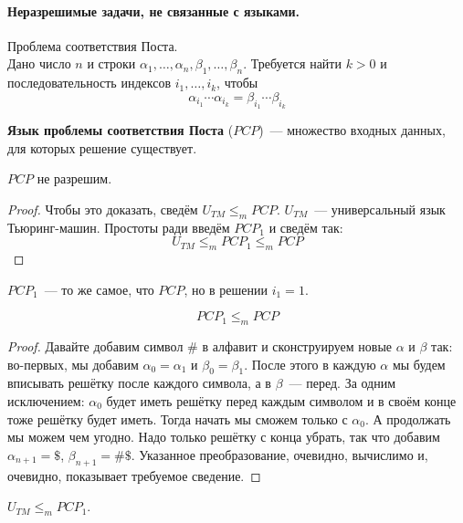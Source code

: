 \documentclass{article}
\begin{document}
    \paragraph{Неразрешимые задачи, не связанные с языками.}
    \begin{example}
        Проблема соответствия Поста.\\
        Дано число $n$ и строки $\alpha_1,\ldots,\alpha_n,\beta_1,\ldots,\beta_n$. Требуется найти $k>0$ и последовательность индексов $i_1,\ldots,i_k$, чтобы
        $$
        \alpha_{i_1}\cdots\alpha_{i_k}=\beta_{i_1}\cdots\beta_{i_k}
        $$
    \end{example}
    \begin{definition}
        \textbf{Язык проблемы соответствия Поста} ($PCP$)~--- множество входных данных, для которых решение существует.
    \end{definition}
    \begin{theorem}
        $PCP$ не разрешим.
    \end{theorem}
    \begin{proof}
        Чтобы это доказать, сведём $U_{TM}\leqslant_mPCP$. $U_{TM}$~--- универсальный язык Тьюринг-машин. Простоты ради введём $PCP_1$ и сведём так:
        $$
        U_{TM}\leqslant_mPCP_1\leqslant_mPCP
        $$
    \end{proof}
    \begin{definition}
        $PCP_1$~--- то же самое, что $PCP$, но в решении $i_1=1$.
    \end{definition}
    \begin{lemma}
        $$
        PCP_1\leqslant_m PCP
        $$
    \end{lemma}
    \begin{proof}
        Давайте добавим символ $\#$ в алфавит и сконструируем новые $\alpha$ и $\beta$ так: во-первых, мы добавим $\alpha_0=\alpha_1$ и $\beta_0=\beta_1$. После этого в каждую $\alpha$ мы будем вписывать решётку после каждого символа, а в $\beta$~--- перед. За одним исключением: $\alpha_0$ будет иметь решётку перед каждым символом и в своём конце тоже решётку будет иметь. Тогда начать мы сможем только с $\alpha_0$. А продолжать мы можем чем угодно. Надо только решётку с конца убрать, так что добавим $\alpha_{n+1}=\$$, $\beta_{n+1}=\#\$$. Указанное преобразование, очевидно, вычислимо и, очевидно, показывает требуемое сведение.
    \end{proof}
    \begin{theorem}
        $U_{TM}\leqslant_mPCP_1$.
    \end{theorem}
\end{document}
